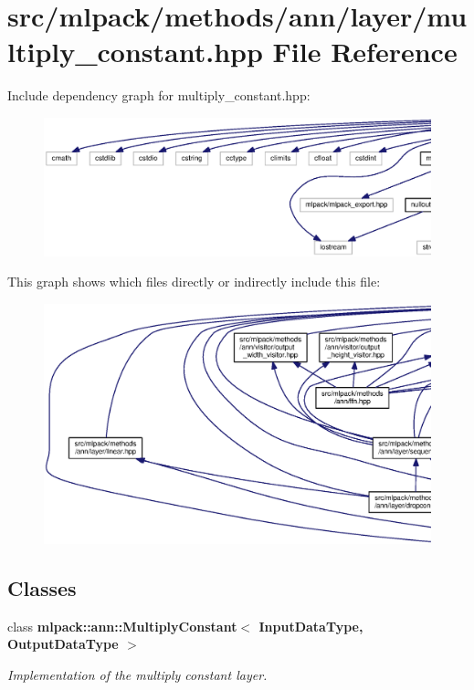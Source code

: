 \section{src/mlpack/methods/ann/layer/multiply\+\_\+constant.hpp File Reference}
\label{multiply__constant_8hpp}
Include dependency graph for multiply\+\_\+constant.\+hpp\+:
\nopagebreak
\begin{figure}[H]
\begin{center}
\leavevmode
\includegraphics[width=350pt]{multiply__constant_8hpp__incl}
\end{center}
\end{figure}
This graph shows which files directly or indirectly include this file\+:
\nopagebreak
\begin{figure}[H]
\begin{center}
\leavevmode
\includegraphics[width=350pt]{multiply__constant_8hpp__dep__incl}
\end{center}
\end{figure}
\subsection*{Classes}
\begin{DoxyCompactItemize}
\item 
class {\bf mlpack\+::ann\+::\+Multiply\+Constant$<$ Input\+Data\+Type, Output\+Data\+Type $>$}
\begin{DoxyCompactList}\small\item\em Implementation of the multiply constant layer. \end{DoxyCompactList}\end{DoxyCompactItemize}
